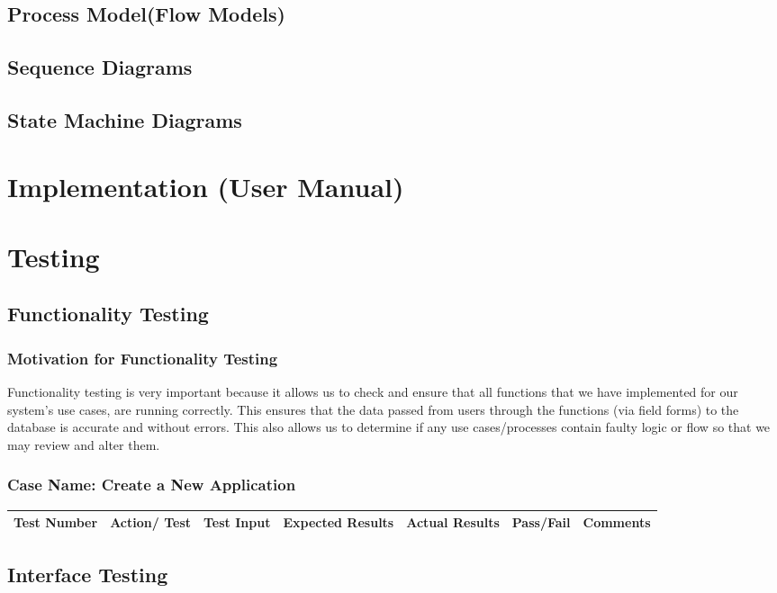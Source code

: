 \documentclass{article}
\begin{document}
\subsection{Process Model(Flow Models)}
\subsection{Sequence Diagrams}
\subsection{State Machine Diagrams}

\section{Implementation (User Manual)}

\section{Testing}
\subsection{Functionality Testing}
\subsubsection{Motivation for Functionality Testing} 
Functionality testing is very important because it allows us to check and ensure that all functions that we have implemented for our system’s use
cases, are running correctly. This ensures that the data passed from users through the functions (via field forms) to the database is accurate and
without errors. This also allows us to determine if any use cases/processes contain faulty logic or flow so that we may review and alter them. 
\subsubsection{Case Name: Create a New Application} 
\begin{tabu} to \textwidth {| X[l] | X[l] | X[l] | X[l] | X[l] | X[l] | X[l]|}
\hline
\textbf{Test Number} & \textbf{Action/ Test} & \textbf{Test Input} & \textbf{Expected Results} & \textbf{Actual Results} & \textbf{Pass/Fail} & \textbf{Comments} \\
\hline
\end{tabu}
\subsection{Interface Testing}
\end{document}
